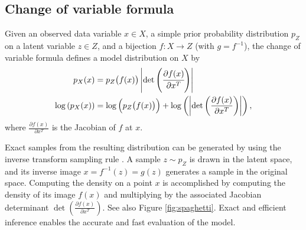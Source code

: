 \documentclass{article}
\newcommand{\jcom}[1]{\textcolor{darkgreen}{[jascha: #1]}}
\begin{document}
\subsection{Change of variable formula}
Given an observed data variable $x \in X$,
a simple prior probability distribution $p_{Z}$ on a latent variable $z \in Z$,
and a bijection $f: X \rightarrow Z$ (with $g = f^{-1}$),
the change of variable formula defines a model distribution on $X$ by
\begin{align}
p_{X}(x) &= p_{Z}\big(f(x)\big) \left|\det\left(\cfrac{\partial f(x)}{\partial x^T} \right)\right|
\label{eq:change-variables}\\
\log\left(p_{X}(x)\right) &= \log\Big(p_{Z}\big(f(x)\big)\Big) + \log\left(\left|\det\left(\frac{\partial f(x)}{\partial x^T}\right)\right|\right)
,
\end{align}
where $\frac{\partial f(x)}{\partial x^T}$ is the Jacobian of $f$ at $x$.

Exact samples from the resulting distribution can be generated by using the inverse transform sampling rule \citep{devroye1986sample}. A sample $z \sim p_{Z}$ is drawn in the latent space, and its inverse image $x = f^{-1}(z) = g(z)$ generates a sample in the original space. Computing the density on a point $x$ is accomplished by computing the density of its image $f(x)$ and multiplying by the associated Jacobian determinant $\det\left(\frac{\partial f(x)}{\partial x^T}\right)$. See also Figure \ref{fig:spaghetti}. Exact and efficient inference enables the accurate and fast evaluation of the model.


\end{document}
